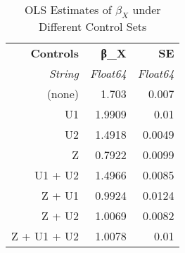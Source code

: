 \begin{table}[ht]
\centering
\caption{OLS Estimates of $\beta_X$ under Different Control Sets}
\label{tab:regressions}
\begin{tabular}{|r|r|r|}
  \hline
  \textbf{Controls} & \textbf{β\_X} & \textbf{SE} \\
  \textit{String} & \textit{Float64} & \textit{Float64} \\
  \hline
  (none) & 1.703 & 0.007 \\
  U1 & 1.9909 & 0.01 \\
  U2 & 1.4918 & 0.0049 \\
  Z & 0.7922 & 0.0099 \\
  U1 + U2 & 1.4966 & 0.0085 \\
  Z + U1 & 0.9924 & 0.0124 \\
  Z + U2 & 1.0069 & 0.0082 \\
  Z + U1 + U2 & 1.0078 & 0.01 \\
  \hline
\end{tabular}

\end{table}
